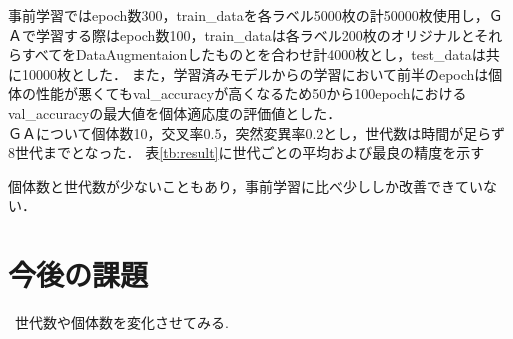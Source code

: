 \documentclass[twocolumn]{ujarticle}     %
\begin{document}
\begin{table}[h]
	\centering
	\caption{学習パラメータ\label{tb:param}}
\end{table}
事前学習ではepoch数300，train\_dataを各ラベル5000枚の計50000枚使用し，ＧＡで学習する際はepoch数100，train\_dataは各ラベル200枚のオリジナルとそれらすべてをDataAugmentaionしたものとを合わせ計4000枚とし，test\_dataは共に10000枚とした．
また，学習済みモデルからの学習において前半のepochは個体の性能が悪くてもval\_accuracyが高くなるため50から100epochにおけるval\_accuracyの最大値を個体適応度の評価値とした．\\
ＧＡについて個体数10，交叉率0.5，突然変異率0.2とし，世代数は時間が足らず8世代までとなった．
表\ref{tb:result}に世代ごとの平均および最良の精度を示す
\begin{table}[h]
	\centering
	\caption{実験結果\label{tb:result}}
\end{table}
個体数と世代数が少ないこともあり，事前学習に比べ少ししか改善できていない．
\section{今後の課題}
\ 世代数や個体数を変化させてみる.
\end{document}
